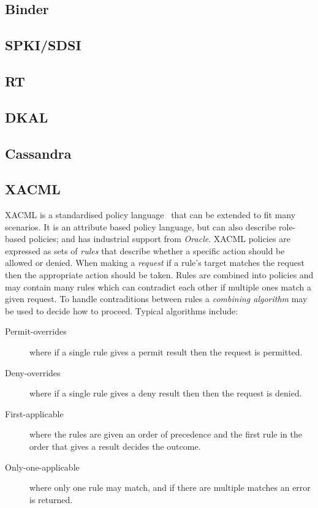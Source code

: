 \documentclass[thesis.tex]{subfiles}
\begin{document}

\subsection{Binder}
\subsection{SPKI/SDSI}
\subsection{RT}
\subsection{DKAL}
\subsection{Cassandra}
\subsection{XACML}

XACML is a standardised policy language~\cite{oasis_extensible_2013} that can be
extended to fit many scenarios. It is an attribute based policy language, but
can also describe role-based policies; and has industrial support from
\emph{Oracle}. XACML policies are expressed as sets of \emph{rules} that
describe whether a specific action should be allowed or denied. When making a
\emph{request} if a rule's target matches the request then the appropriate
action should be taken. Rules are combined into policies and may contain many
rules which can contradict each other if multiple ones match a given request. To
handle contraditions between rules a \emph{combining algorithm} may be used to
decide how to proceed. Typical algorithms include:

\begin{description}
  \item[Permit-overrides] where if a single rule gives a permit result then the request is permitted.
  \item[Deny-overrides] where if a single rule gives a deny result then then the request is denied.
  \item[First-applicable] where the rules are given an order of precedence and the first rule in the order that gives a result decides the outcome.
  \item[Only-one-applicable] where only one rule may match, and if there are multiple matches an error is returned.
\end{description}
\end{document}

